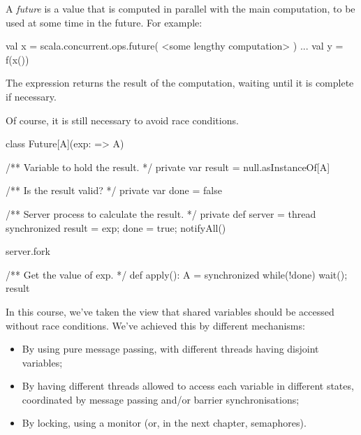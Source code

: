 \documentclass[notes,color]{sepslide0}
\begin{document}



\begin{slide}

A \emph{future} is a value that is computed in parallel with the main
computation, to be used at some time in the future.  For example:
%
\begin{scala}
val x = scala.concurrent.ops.future(
  <some lengthy computation>
)
...
val y = f(x())
\end{scala}
%
The expression  returns the result of the computation, waiting
until it is complete if necessary.

Of course, it is still necessary to avoid race conditions.
\end{slide}


\begin{slide}

\begin{scala}
class Future[A](exp: => A){
  /** Variable to hold the result. */
  private var result = null.asInstanceOf[A]

  /** Is the result valid? */
  private var done = false

  /** Server process to calculate the result. */
  private def server = thread{
    synchronized{ result = exp; done = true; notifyAll() }
  }

  server.fork

  /** Get the value of exp. */
  def apply(): A = synchronized{ while(!done) wait(); result }
}
\end{scala}
\end{slide}


\begin{slide}

In this course, we've taken the view that shared variables should be accessed
without race conditions.  We've achieved this by different mechanisms:
%
\begin{itemize}
\item By using pure message passing, with different threads having disjoint
  variables;

\item By having different threads allowed to access each variable in different
  states, coordinated by message passing and/or barrier synchronisations;

\item By locking, using a monitor (or, in the next chapter, semaphores).
\end{itemize}
\end{slide}
\end{document}
